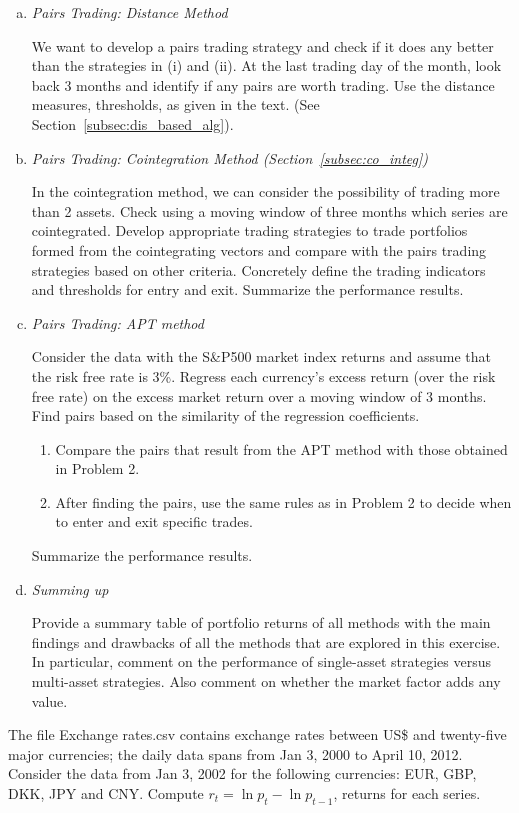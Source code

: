 \begin{enumerate}[(a)]
	\item {\it Pairs Trading: Distance Method}

We want to develop a pairs trading strategy and check if it does any better than  the strategies in (i) and (ii). At the last trading day of the month, look back 3 months and identify if any pairs are worth trading. Use the distance measures, thresholds, as given in the text. (See Section~\ref{subsec:dis_based_alg}).

	\item {\it Pairs Trading: Cointegration Method (Section~\ref{subsec:co_integ})}

In the cointegration method, we can consider the possibility of trading more than 2 assets. Check using a moving window of three months which series are cointegrated. Develop appropriate trading strategies to trade portfolios formed from the cointegrating vectors and compare with the pairs trading strategies based on other criteria. Concretely define the trading indicators and thresholds for entry and exit. Summarize the performance results.

	\item {\it Pairs Trading: APT method}

Consider the data with the S\&P500 market index returns and assume that the risk free rate is 3\%. Regress each currency's excess return (over the risk free rate) on the excess market return over a moving window of 3 months. Find pairs based on the similarity of the regression coefficients.
	\begin{enumerate}
	\item Compare the pairs that result from the APT method with those obtained in Problem 2.
	\item After finding the pairs, use the same rules as in Problem 2 to decide when to enter and exit specific trades.
	\end{enumerate}
Summarize the performance results.

	\item {\it Summing up}

Provide a summary table of portfolio returns of all methods with the main findings and drawbacks of all the methods that are explored in this exercise. In particular, comment on the performance of single-asset strategies versus multi-asset strategies. Also comment on whether the market factor adds any value. \twomedskip
	\end{enumerate}


\prob The file Exchange rates.csv contains exchange rates between US\$ and twenty-five major currencies; the daily data spans from Jan 3, 2000 to April 10, 2012. Consider the data from Jan 3, 2002 for the following currencies: EUR, GBP, DKK, JPY and CNY. Compute $r_t = \ln{p_t} - \ln{p_{t-1}}$, returns for each series. \twomedskip


